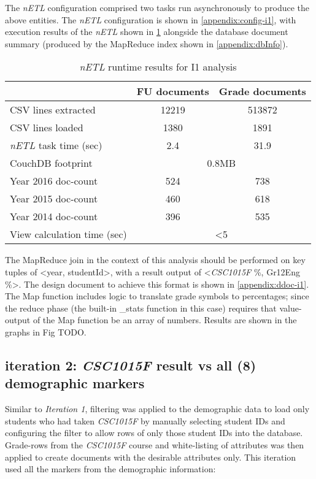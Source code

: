 The \textit{nETL} configuration comprised two tasks run asynchronously to produce the above entities. The \textit{nETL} configuration is shown in \ref{appendix:config-i1}, with execution results of the \textit{nETL} shown in \ref{i1-results} alongside the database document summary (produced by the MapReduce index shown in \ref{appendix:dbInfo}).

\begin{table}[]
    \centering
    \caption{\textit{nETL} runtime results for I1 analysis}
    \label{i1-results}
    \begin{tabular}{lcc}
                                      & FU documents                    & Grade documents \\ \hline
        CSV lines extracted           & 12219                           & 513872          \\
        CSV lines loaded              & 1380                            & 1891            \\
        \textit{nETL} task time (sec) & 2.4                             & 31.9            \\
        CouchDB footprint             & \multicolumn{2}{c}{0.8MB}                         \\
        Year 2016 doc-count           & 524                             & 738             \\
        Year 2015 doc-count           & 460                             & 618             \\
        Year 2014 doc-count           & 396                             & 535             \\
        View calculation time (sec)   & \multicolumn{2}{c}{\textless 5}                   \\
    \end{tabular}
\end{table}

The MapReduce join in the context of this analysis should be performed on key tuples of <year, studentId>, with a result output of <\textit{CSC1015F} \%, Gr12Eng \%>. The design document to achieve this format is shown in \ref{appendix:ddoc-i1}. The Map function includes logic to translate grade symbols to percentages; since the reduce phase (the built-in \_stats function in this case) requires that value-output of the Map function be an array of numbers. Results are shown in the graphs in Fig TODO.

\subsection{iteration 2: \textit{CSC1015F} result vs all (8) demographic markers}
Similar to \textit{Iteration 1}, filtering was applied to the demographic data to load only students who had taken \textit{CSC1015F} by manually selecting student IDs and configuring the filter to allow rows of only those student IDs into the database. Grade-rows from the \textit{CSC1015F} course and white-listing of attributes was then applied to create documents with the desirable attributes only. This iteration used all the markers from the demographic information:

